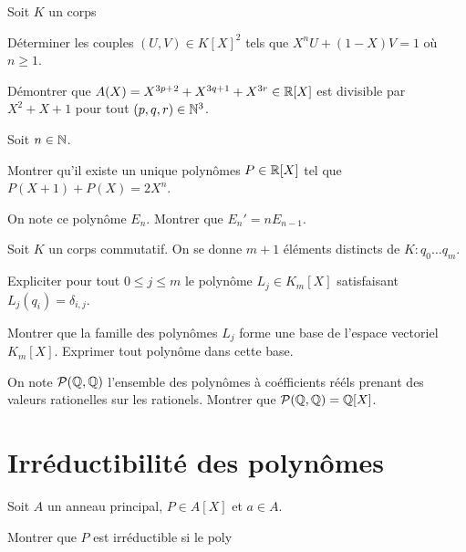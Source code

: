 \documentclass[french]{report}
\begin{document}
\begin{exo}
    Soit \(K\) un corps
    \begin{q}{1}
        Déterminer les couples \(\left(U, V\right)\in K[X]^2\) tels que
        \(X^nU+\left(1-X\right)V=1\) où \(n\geq 1\).
    \end{q}
    \begin{q}{2}
        Démontrer que \(A(X)=X^{3p+2}+X^{3q+1}+X^{3r}\in\mathbb{R}[X]\) est divisible
        par \(X^2+X+1\) pour tout \(\left(p,q,r\right)\in\mathbb{N}^3\).
    \end{q}
\end{exo}

\begin{exo}
    Soit \(n\in\mathbb{N}\).
    \begin{q}{1}
        Montrer qu'il existe un unique polynômes \(P\in\mathbb{R}[X]\) tel que
        \(P(X+1)+P(X) = 2X^n\).
    \end{q}
    \begin{q}{2}
        On note ce polynôme \(E_n\). Montrer que \(E_n'=nE_{n-1}\).
    \end{q}
\end{exo}

\begin{exo}
    Soit \(K\) un corps commutatif. On se donne \(m+1\) éléments distincts de \(K\colon
    q_0\dots q_m\).
    \begin{q}{1}
        Expliciter pour tout \(0\leq j\leq m\) le polynôme \(L_j\in K_m[X]\)
        satisfaisant \(L_j(q_i) = \delta_{i,j}\).
    \end{q}
    \begin{q}{2}
        Montrer que la famille des polynômes \(L_j\) forme une base de l'espace vectoriel
        \(K_m[X]\). Exprimer tout polynôme dans cette base.
    \end{q}
    \begin{q}{3}
        On note \(\mathcal{P}(\mathbb{Q}, \mathbb{Q})\) l'ensemble des polynômes à coéfficients rééls prenant des valeurs
        rationelles sur les rationels. Montrer que \(\mathcal{P}(\mathbb{Q}, \mathbb{Q})=\mathbb{Q}[X]\).
    \end{q}
\end{exo}

\section*{Irréductibilité des polynômes}

\begin{exo}
    Soit \(A\) un anneau principal, \(P\in A[X]\) et \(a\in A\).
    \begin{q}{1}
        Montrer que \(P\) est irréductible si le poly
    \end{q}
\end{exo}
\end{document}
